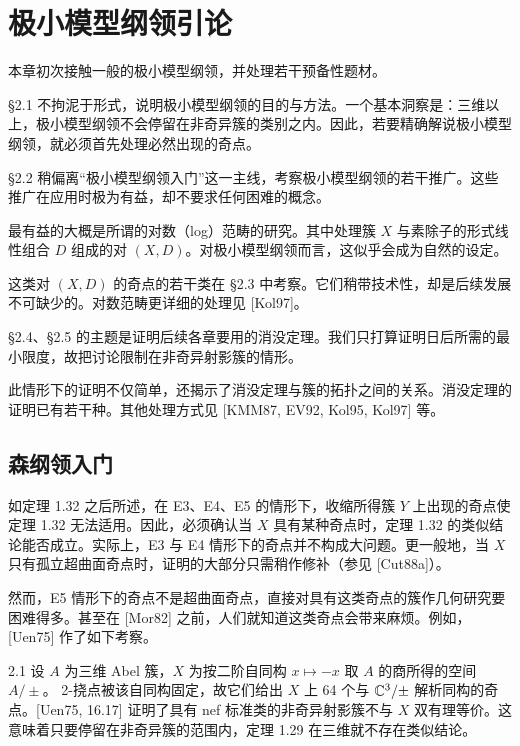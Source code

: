 \chapter{极小模型纲领引论}

本章初次接触一般的极小模型纲领，并处理若干预备性题材。

§2.1 不拘泥于形式，说明极小模型纲领的目的与方法。一个基本洞察是：三维以上，极小模型纲领不会停留在非奇异簇的类别之内。因此，若要精确解说极小模型纲领，就必须首先处理必然出现的奇点。

§2.2 稍偏离“极小模型纲领入门”这一主线，考察极小模型纲领的若干推广。这些推广在应用时极为有益，却不要求任何困难的概念。

最有益的大概是所谓的对数（log）范畴的研究。其中处理簇 $X$ 与素除子的形式线性组合 $D$ 组成的对 $(X,D)$。对极小模型纲领而言，这似乎会成为自然的设定。

这类对 $(X,D)$ 的奇点的若干类在 §2.3 中考察。它们稍带技术性，却是后续发展不可缺少的。对数范畴更详细的处理见 [Kol97]。

§2.4、§2.5 的主题是证明后续各章要用的消没定理。我们只打算证明日后所需的最小限度，故把讨论限制在非奇异射影簇的情形。

此情形下的证明不仅简单，还揭示了消没定理与簇的拓扑之间的关系。消没定理的证明已有若干种。其他处理方式见 [KMM87, EV92, Kol95, Kol97] 等。

\section{森纲领入门}


如定理 1.32 之后所述，在 E3、E4、E5 的情形下，收缩所得簇 $Y$ 上出现的奇点使定理 1.32 无法适用。因此，必须确认当 $X$ 具有某种奇点时，定理 1.32 的类似结论能否成立。实际上，E3 与 E4 情形下的奇点并不构成大问题。更一般地，当 $X$ 只有孤立超曲面奇点时，证明的大部分只需稍作修补（参见 [Cut88a]）。

然而，E5 情形下的奇点不是超曲面奇点，直接对具有这类奇点的簇作几何研究要困难得多。甚至在 [Mor82] 之前，人们就知道这类奇点会带来麻烦。例如，[Uen75] 作了如下考察。

\begin{example}{2.1}
设 $A$ 为三维 Abel 簇，$X$ 为按二阶自同构 $x\mapsto -x$ 取 $A$ 的商所得的空间 $A/\pm$。
2-挠点被该自同构固定，故它们给出 $X$ 上 64 个与 $\mathbb{C}^3/\pm$ 解析同构的奇点。[Uen75, 16.17] 证明了具有 nef 标准类的非奇异射影簇不与 $X$ 双有理等价。这意味着只要停留在非奇异簇的范围内，定理 1.29 在三维就不存在类似结论。
\end{example}

